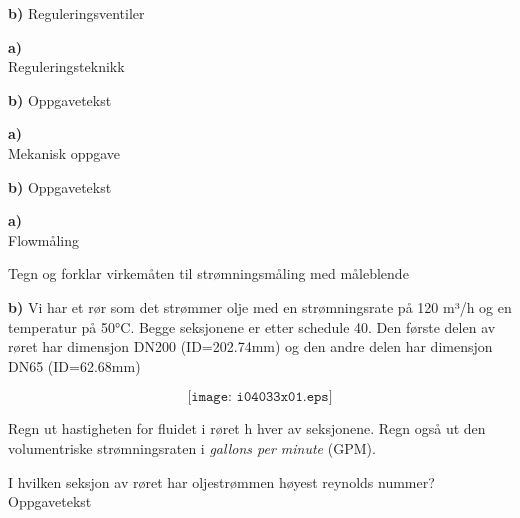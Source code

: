 \textbf{b)}
Reguleringsventiler
\vskip 1cm 

\vfil \eject
\oppgave{}%
\textbf{a)}\\
Reguleringsteknikk
\vskip 1cm 


\textbf{b)}
Oppgavetekst
\vskip 1cm 
\vfil \eject
\oppgave{}%
\textbf{a)}\\
Mekanisk oppgave
\vskip 1cm 


\textbf{b)}
Oppgavetekst
\vskip 1cm 


\vfil \eject
\oppgave{}%
\textbf{a)}\\
Flowmåling
\vskip 1cm 

Tegn og forklar virkemåten til strømningsmåling med måleblende
\vskip 1cm

\textbf{b)}
Vi har et rør som det strømmer olje med en strømningsrate på 120 m³/h og en temperatur på 50°C. Begge seksjonene er etter schedule 40.  Den første delen av røret har dimensjon DN200 (ID=202.74mm) og den andre delen har dimensjon DN65 (ID=62.68mm)

$$\texttt{[image: i04033x01.eps]}$$

Regn ut hastigheten for fluidet i røret h hver av seksjonene. Regn også ut den volumentriske strømningsraten i \textit{gallons per minute} (GPM). 


\vskip 10pt

I hvilken seksjon av røret har oljestrømmen høyest reynolds nummer?
Oppgavetekst
\vskip 1cm 

